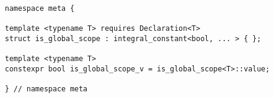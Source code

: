 
\begin{verbatim}
namespace meta {

template <typename T> requires Declaration<T>
struct is_global_scope : integral_constant<bool, ... > { };

template <typename T>
constexpr bool is_global_scope_v = is_global_scope<T>::value;

} // namespace meta
\end{verbatim}

